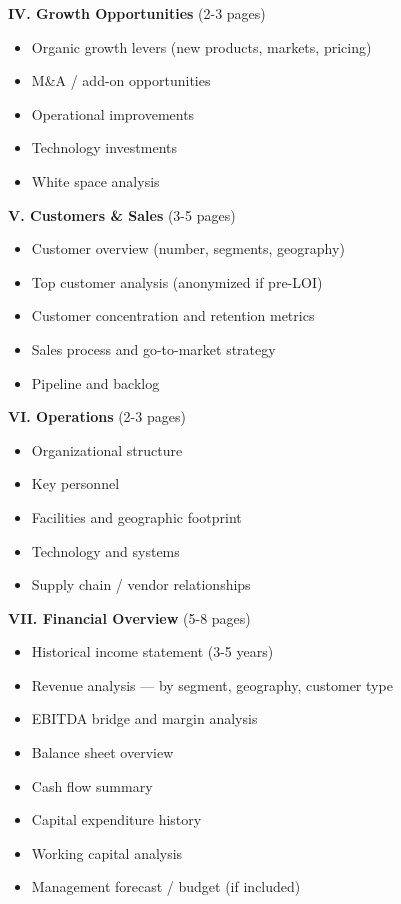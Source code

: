 \documentclass[11pt]{article}
\begin{document}
\textbf{IV. Growth Opportunities} (2-3 pages)

\begin{itemize}[leftmargin=*,itemsep=2pt,topsep=2pt]
\item {} Organic growth levers (new products, markets, pricing)
\item {} M\&A / add-on opportunities
\item {} Operational improvements
\item {} Technology investments
\item {} White space analysis
\end{itemize}

\textbf{V. Customers \& Sales} (3-5 pages)

\begin{itemize}[leftmargin=*,itemsep=2pt,topsep=2pt]
\item {} Customer overview (number, segments, geography)
\item {} Top customer analysis (anonymized if pre-LOI)
\item {} Customer concentration and retention metrics
\item {} Sales process and go-to-market strategy
\item {} Pipeline and backlog
\end{itemize}

\textbf{VI. Operations} (2-3 pages)

\begin{itemize}[leftmargin=*,itemsep=2pt,topsep=2pt]
\item {} Organizational structure
\item {} Key personnel
\item {} Facilities and geographic footprint
\item {} Technology and systems
\item {} Supply chain / vendor relationships
\end{itemize}

\textbf{VII. Financial Overview} (5-8 pages)

\begin{itemize}[leftmargin=*,itemsep=2pt,topsep=2pt]
\item {} Historical income statement (3-5 years)
\item {} Revenue analysis — by segment, geography, customer type
\item {} EBITDA bridge and margin analysis
\item {} Balance sheet overview
\item {} Cash flow summary
\item {} Capital expenditure history
\item {} Working capital analysis
\item {} Management forecast / budget (if included)
\end{itemize}
\end{document}
